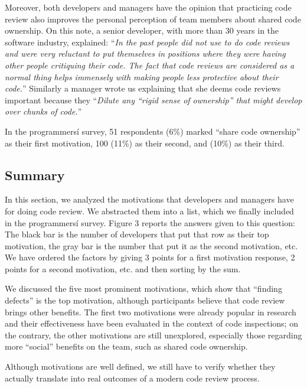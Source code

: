\documentclass[conference]{IEEEtran}
\renewcommand{\quotation}[1]{``\emph{#1}''}
\begin{document}
Moreover, both developers and managers have the opinion that practicing code
review also improves the personal perception of team members about shared code
ownership. On this note, a senior developer, with more than 30 years in the
software industry, explained: \quotation{In the past people did not use to do
code reviews and were very reluctant to put themselves in positions where they
were having other people critiquing their code. The fact that code reviews are
considered as a normal thing helps immensely with making people less protective
about their code.} Similarly a manager wrote us explaining that she deems code
reviews important because they \quotation{Dilute any ``rigid sense of
ownership'' that might develop over chunks of code.}

In the programmersí survey, 51 respondents (6\%) marked ``share code
ownership'' as their first motivation, 100 (11\%) as their second, and (10\%)
as their third.

\subsection{Summary}

In this section, we analyzed the motivations that developers and managers have
for doing code review. We abstracted them into a list, which we finally
included in the programmersí survey. Figure 3 reports the answers given to this
question: The black bar is the number of developers that put that row as their
top motivation, the gray bar is the number that put it as the second
motivation, etc. We have ordered the factors by giving 3 points for a first
motivation response, 2 points for a second motivation, etc. and then sorting by
the sum. 

We discussed the five most prominent motivations, which show that ``finding
defects'' is the top motivation, although participants believe that code review
brings other benefits. The first two motivations were already popular in
research and their effectiveness have been evaluated in the context of code
inspections; on the contrary, the other motivations are still unexplored,
especially those regarding more ``social'' benefits on the team, such as shared
code ownership.

Although motivations are well defined, we still have to verify whether they
actually translate into real outcomes of a modern code review process. 





\small

\end{document}

